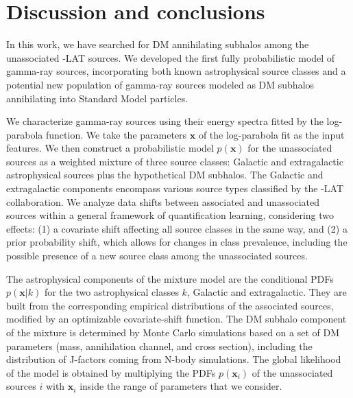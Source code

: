 \section{Discussion and conclusions}
\label{sec:halos:conclusions}
In this work, we have searched for DM annihilating subhalos among the unassociated \Fermi-LAT sources. We developed the first fully probabilistic model of gamma-ray sources, incorporating both known astrophysical source classes and a potential new population of gamma-ray sources modeled as DM subhalos annihilating into Standard Model particles. 

We characterize gamma-ray sources using their  energy spectra fitted by the log-parabola function.
We take the parameters $\mathbf{x}$ of the log-parabola fit as the input features. 
We then
construct a probabilistic model $p(\textbf{x})$ for the unassociated sources as a weighted mixture of three source classes: Galactic and extragalactic astrophysical sources plus the hypothetical DM subhalos. The Galactic and extragalactic components encompass various source types classified by the \Fermi-LAT collaboration. We analyze data shifts between associated and unassociated sources within a general framework of quantification learning, considering two effects: (1) a covariate shift affecting all source classes in the same way, and (2) a prior probability shift, which allows for changes in class prevalence, including the possible presence of a new source class among the unassociated sources.

The astrophysical components of the mixture model are the conditional PDFs $p(\textbf{x}|k)$ for the two astrophysical classes $k$, Galactic and extragalactic.
They are built from the corresponding empirical distributions of the associated sources, modified by an optimizable covariate-shift function. The DM subhalo component of the mixture is determined by Monte Carlo simulations based on a set of DM parameters (mass, annihilation channel, and cross section), including the distribution of J-factors coming from N-body simulations. The global likelihood of the model is obtained by multiplying the PDFs $p(\textbf{x}_i)$ of the unassociated sources $i$ with $\textbf{x}_i$ inside the range of parameters that we consider. 

